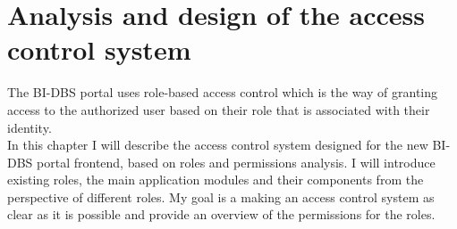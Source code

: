 \chapter{Analysis and design of the access control system} The BI-DBS portal uses role-based access control which is the way of granting access to the authorized user based on their role  that is associated with their identity.\\ %
In this chapter I will describe the access control system designed for the new BI-DBS portal frontend, based on roles and permissions analysis. I will introduce existing roles, the main application modules and their components from the perspective of different roles. My goal is a making an access control system as clear as it is possible and provide an overview of the permissions for the roles.







